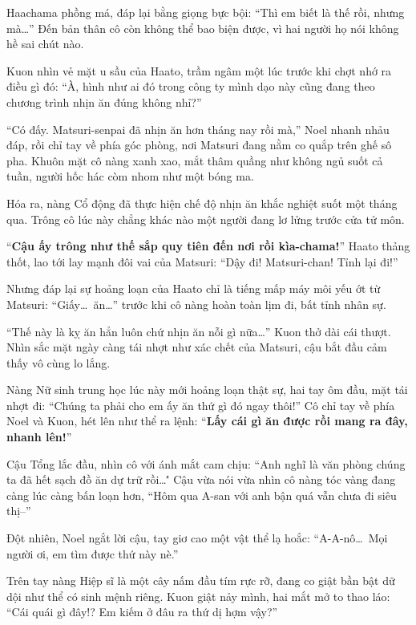 \documentclass[../main.tex]{subfiles}
\begin{document}
Haachama phồng má, đáp lại bằng giọng bực bội: ``Thì em biết là thế rồi, nhưng mà\dots'' Đến bản thân cô còn không thể bao biện được, vì hai người họ nói không hề sai chút nào.

Kuon nhìn vẻ mặt u sầu của Haato, trầm ngâm một lúc trước khi chợt nhớ ra điều gì đó: ``À, hình như ai đó trong công ty mình dạo này cũng đang theo chương trình nhịn ăn đúng không nhỉ?''

``Có đấy. Matsuri-senpai đã nhịn ăn hơn tháng nay rồi mà,'' Noel nhanh nhảu đáp, rồi chỉ tay về phía góc phòng, nơi Matsuri đang nằm co quắp trên ghế sô pha. Khuôn mặt cô nàng xanh xao, mắt thâm quầng như không ngủ suốt cả tuần, người hốc hác còm nhom như một bóng ma.


Hóa ra, nàng Cổ động đã thực hiện chế độ nhịn ăn khắc nghiệt suốt một tháng qua. Trông cô lúc này chẳng khác nào một người đang lơ lửng trước cửa tử môn.

``\textbf{Cậu ấy trông như thế sắp quy tiên đến nơi rồi kìa-chama!}'' Haato thảng thốt, lao tới lay mạnh đôi vai của Matsuri: ``Dậy đi! Matsuri-chan! Tỉnh lại đi!''

Nhưng đáp lại sự hoảng loạn của Haato chỉ là tiếng mấp máy môi yếu ớt từ Matsuri: ``Giấy\dots\ ăn\dots'' trước khi cô nàng hoàn toàn lịm đi, bất tỉnh nhân sự.

``Thế này là kỵ ăn hẳn luôn chứ nhịn ăn nỗi gì nữa\dots'' Kuon thở dài cái thượt. Nhìn sắc mặt ngày càng tái nhợt như xác chết của Matsuri, cậu bắt đầu cảm thấy vô cùng lo lắng.

Nàng Nữ sinh trung học lúc này mới hoảng loạn thật sự, hai tay ôm đầu, mặt tái nhợt đi: ``Chúng ta phải cho em ấy ăn thứ gì đó ngay thôi!'' Cô chỉ tay về phía Noel và Kuon, hét lên như thể ra lệnh: ``\textbf{Lấy cái gì ăn được rồi mang ra đây, nhanh lên!}''

Cậu Tổng lắc đầu, nhìn cô với ánh mắt cam chịu: ``Anh nghĩ là văn phòng chúng ta đã hết sạch đồ ăn dự trữ rồi\dots\'' Cậu vừa nói vừa nhìn cô nàng tóc vàng đang càng lúc càng bấn loạn hơn, ``Hôm qua A-san với anh bận quá vẫn chưa đi siêu thị--''

Đột nhiên, Noel ngắt lời cậu, tay giơ cao một vật thể lạ hoắc: ``A-A-nô\dots\ Mọi người ơi, em tìm được thứ này nè.''


Trên tay nàng Hiệp sĩ là một cây nấm đầu tím rực rỡ, đang co giật bần bật dữ dội như thể có sinh mệnh riêng. Kuon giật nảy mình, hai mắt mở to thao láo: ``Cái quái gì đây!? Em kiếm ở đâu ra thứ dị hợm vậy?''
\end{document}
